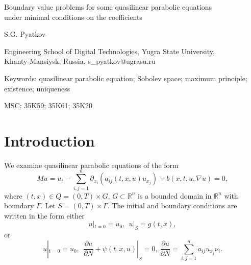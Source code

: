 \documentclass{article}
\theoremstyle{plain}
\begin{document}
\begin{center} {Boundary value problems for some quasilinear parabolic equations \\ under minimal conditions on the coefficients}

\vspace{0.5cm}

S.G.  Pyatkov

\vspace{0.5cm}

Engineering School  of Digital Technologies, Yugra State University,  \\
  Khanty-Mansiysk, Russia, s\_pyatkov@ugrasu.ru
  



\noindent\parbox{11cm}{  }
\end{center}

\bigskip
Keywords: quasilinear parabolic equation; Sobolev space; maximum principle;
existence;  uniqueness

\medskip

MSC: 35K59; 35K61; 35K20



\section{Introduction}


 We examine quasilinear parabolic equations of the form 
\begin{equation}\label{e1}
	Mu= u_t-\sum_{i,j=1}^n \partial_{x_i}(a_{ij}(t,x,u)u_{x_j})+ b(x,t,u,\nabla u)=0,
\end{equation}
where $(t,x)\in Q = (0,T) \times G$,   $G\subset {\mathbb R}^n$ is a bounded domain in ${\mathbb R}^n$ with boundary   $\Gamma$. Let    $S= (0,T)\times\Gamma$.
The initial and boundary conditions are written in the form either
\begin{equation}\label{e2}
	u|_{t=0}=u_0,\ \ u|_{S}= g(t,x), 
\end{equation}
or
\begin{equation}\label{e3}
	u|_{t=0}=u_0,\ \ \frac{\partial u}{\partial N}+ \psi(t,x,u)|_{S}=0, \ \frac{\partial u}{\partial N}= \sum_{i,j=1}^na_{ij}u_{x_j}\nu_i.
\end{equation}
\end{document}
